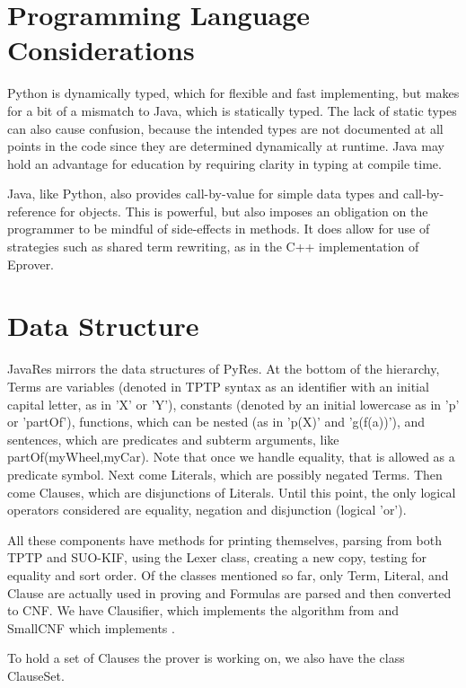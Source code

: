 \documentclass{llncs}
\begin{document}
\section{Programming Language Considerations}

Python is dynamically typed, which for flexible and fast implementing, but makes
for a bit of a mismatch to Java, which is statically typed.  The lack of static
types can also cause confusion, because the intended types are not
documented at all points in the code since they are determined dynamically at
runtime.  Java may hold an advantage for education by requiring clarity in typing
at compile time.

Java, like Python, also provides call-by-value for simple data types and call-by-reference for
objects.  This is powerful, but also imposes an obligation on the programmer to
be mindful of side-effects in methods.  It does allow for use of strategies such as
shared term rewriting, as in the C++ implementation of Eprover.

\section{Data Structure}

JavaRes mirrors the data structures of PyRes.  At the bottom of the hierarchy, Terms
are variables (denoted in TPTP syntax as an identifier with an initial capital letter,
as in 'X' or 'Y'), constants (denoted by an initial lowercase as in 'p' or 'partOf'),
functions, which can be nested (as in 'p(X)' and 'g(f(a))'), and sentences, which are predicates and
subterm arguments, like partOf(myWheel,myCar).  Note that once we handle equality, that
is allowed as a predicate symbol.  Next come Literals,
which are possibly negated Terms.  Then come Clauses, which are disjunctions of Literals.
Until this point, the only logical operators considered are equality, negation and disjunction (logical 'or').

All these components have methods for printing themselves, parsing from both TPTP and
SUO-KIF, using the Lexer class, creating a new copy, testing for equality and sort order. Of the
classes mentioned so far, only Term, Literal, and Clause are actually used in proving and Formulas
are parsed and then converted to CNF.  We have Clausifier, which implements the algorithm from
\cite{RN:AI-95} and SmallCNF which implements \cite{NW:SmallCNF-2001}.

To hold a set of Clauses the prover is working on, we also have the class ClauseSet.
\end{document}
